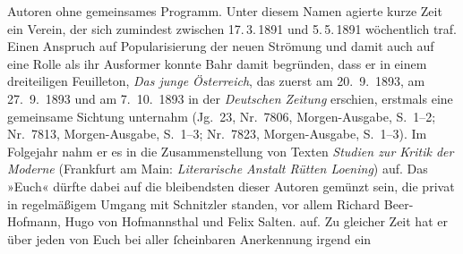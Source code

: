 \begin{ledgroupsized}[t]{13cm}
{{{                  Autoren ohne gemeinsames Programm. Unter diesem Namen agierte kurze Zeit ein
                  Verein, der sich zumindest zwischen 17. 3. 1891 und 5. 5. 1891 wöchentlich traf. Einen Anspruch auf Popularisierung
                  der neuen Strömung und damit auch auf eine Rolle als ihr Ausformer konnte Bahr damit begründen, dass er in einem
                  dreiteiligen Feuilleton, \emph{Das junge
                  Österreich}, das zuerst am 20. 9. 1893, am
                     27. 9. 1893 und am 7. 10. 1893 in der \emph{Deutschen Zeitung} erschien, erstmals eine gemeinsame
                  Sichtung unternahm (Jg. 23, Nr. 7806, Morgen-Ausgabe, S. 1–2; Nr. 7813,
                     Morgen-Ausgabe, S. 1–3; Nr. 7823, Morgen-Ausgabe, S. 1–3). Im Folgejahr
                  nahm er es in die Zusammenstellung von Texten \emph{Studien zur Kritik der Moderne} (Frankfurt am Main: \emph{Literarische Anstalt Rütten {\kaufmannsund} Loening}) auf. Das »Euch« dürfte dabei auf die bleibendsten dieser Autoren gemünzt
                  sein, die privat in regelmäßigem Umgang mit Schnitzler standen, vor allem Richard
                     Beer-Hofmann, Hugo von Hofmannsthal
                  und Felix Salten.}}}\label{K_L02623-1h} auf. Zu gleicher
               Zeit hat er über jeden von Euch bei aller ſcheinbaren Anerkennung irgend ein

\end{ledgroupsized}
